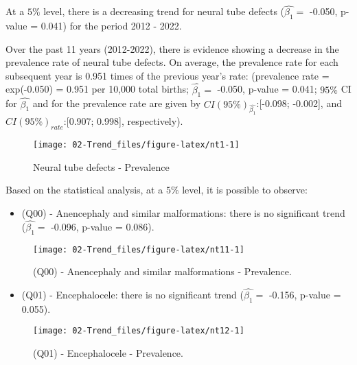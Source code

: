 \documentclass[
]{krantz}
\providecommand{\tightlist}{%
  \setlength{\itemsep}{0pt}\setlength{\parskip}{0pt}}
\begin{document}
At a \(5\%\) level, there is a decreasing trend for neural tube defects (\(\hat{\beta_{1}} =\) -0.050, p-value = 0.041) for the period 2012 - 2022.

Over the past 11 years (2012-2022), there is evidence showing a decrease in the prevalence rate of neural tube defects. On average, the prevalence rate for each subsequent year is 0.951 times of the previous year's rate: (prevalence rate = exp(-0.050) = 0.951 per 10,000 total births; \(\hat{\beta_{1}} =\) -0.050, p-value = 0.041; \(95\%\) CI for \(\hat{\beta_{1}}\) and for the prevalence rate are given by \(CI(95\%)_{\hat{\beta_{1}}}\):{[}-0.098; -0.002{]}, and \(CI(95\%)_{rate}\):{[}0.907; 0.998{]}, respectively).

\begin{figure}[h]

{\centering \texttt{[image: 02-Trend\_files/figure-latex/nt1-1]} 

}

\caption{Neural tube defects - Prevalence}\label{fig:nt1}
\end{figure}

Based on the statistical analysis, at a \(5\%\) level, it is possible to observe:

\begin{itemize}
\tightlist
\item
  (Q00) - Anencephaly and similar malformations: there is no significant trend (\(\hat{\beta_{1}} =\) -0.096, p-value = 0.086).
\end{itemize}

\begin{figure}[h]

{\centering \texttt{[image: 02-Trend\_files/figure-latex/nt11-1]} 

}

\caption{(Q00) - Anencephaly and similar malformations - Prevalence.}\label{fig:nt11}
\end{figure}

\begin{itemize}
\tightlist
\item
  (Q01) - Encephalocele: there is no significant trend (\(\hat{\beta_{1}} =\) -0.156, p-value = 0.055).
\end{itemize}

\begin{figure}[h]

{\centering \texttt{[image: 02-Trend\_files/figure-latex/nt12-1]} 

}

\caption{(Q01) - Encephalocele - Prevalence.}\label{fig:nt12}
\end{figure}
\end{document}
